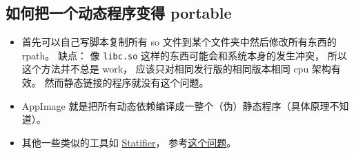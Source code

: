 \subsection{如何把一个动态程序变得 portable}
\begin{itemize}
\item 首先可以自己写脚本复制所有 so 文件到某个文件夹中然后修改所有东西的 rpath。 缺点： 像 \verb`libc.so` 这样的东西可能会和系统本身的发生冲突， 所以这个方法并不总是 work， 应该只对相同发行版的相同版本相同 cpu 架构有效。 然而静态链接的程序就没有这个问题。
\item AppImage 就是把所有动态依赖编译成一整个（伪）静态程序（具体原理不知道）。
\item 其他一些类似的工具如 \href{https://statifier.sourceforge.net/}{Statifier}， 参考\href{https://askubuntu.com/questions/537479/is-there-any-open-source-way-to-make-a-static-from-a-dynamic-executable-with-no}{这个问题}。
\end{itemize}
